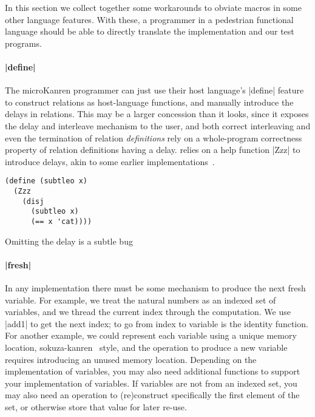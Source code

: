 \documentclass[sigplan,draft,natbib=false]{acmart}
\begin{document}
In this section we collect together some workarounds to obviate macros
in some other language features. With these, a programmer in a
pedestrian functional language should be able to directly translate
the implementation and our test programs.

\paragraph{\rackinline|define|} The microKanren programmer can just
use their host language's \rackinline|define| feature to construct
relations as host-language functions, and manually introduce the
delays in relations. This may be a larger concession than it looks,
since it exposes the delay and interleave mechanism to the user, and
both correct interleaving and even the termination of relation
\emph{definitions} rely on a whole-program correctness property of
relation definitions having a delay.  relies on a
help function \rackinline|Zzz| to introduce delays, akin to some
earlier implementations~\cite{hemann2013muKanren}.


\begin{listing}
  \begin{verbatim}
(define (subtleo x)
  (Zzz
    (disj
      (subtleo x)
      (== x 'cat))))
  \end{verbatim}
  \caption{Omitting the delay is a subtle bug}
  \label{mnt:subtleo}
\end{listing}

\paragraph{\rackinline|fresh|} In any implementation there must be
some mechanism to produce the next fresh variable. For example, we
treat the natural numbers as an indexed set of variables, and we
thread the current index through the computation. We use
\rackinline|add1| to get the next index; to go from index to variable
is the identity function. For another example, we could represent each
variable using a unique memory location,
sokuza-kanren~\cite{kiselyov2006taste} style, and the operation to
produce a new variable requires introducing an unused memory location.
Depending on the implementation of variables, you may also need
additional functions to support your implementation of variables. If
variables are not from an indexed set, you may also need an operation
to (re)construct specifically the first element of the set, or
otherwise store that value for later re-use.
\end{document}
